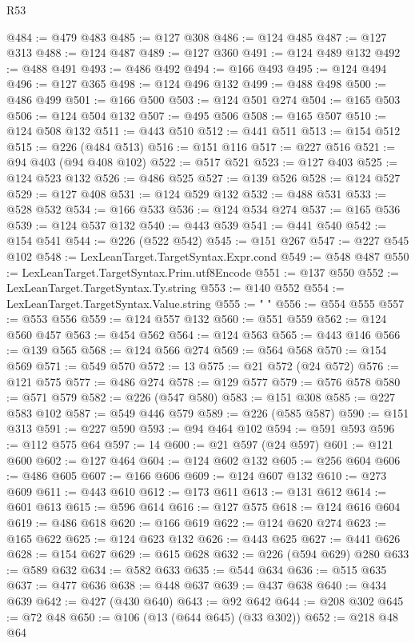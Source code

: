 \begin{lexlean}{R53}
\begin{coremodule}
@484 := @479 @483
@485 := @127 @308
@486 := @124 @485
@487 := @127 @313
@488 := @124 @487
@489 := @127 @360
@491 := @124 @489 @132
@492 := @488 @491
@493 := @486 @492
@494 := @166 @493
@495 := @124 @494
@496 := @127 @365
@498 := @124 @496 @132
@499 := @488 @498
@500 := @486 @499
@501 := @166 @500
@503 := @124 @501 @274
@504 := @165 @503
@506 := @124 @504 @132
@507 := @495 @506
@508 := @165 @507
@510 := @124 @508 @132
@511 := @443 @510
@512 := @441 @511
@513 := @154 @512
@515 := @226 (@484 @513)
@516 := @151 @116
@517 := @227 @516
@521 := @94 @403 (@94 @408 @102)
@522 := @517 @521
@523 := @127 @403
@525 := @124 @523 @132
@526 := @486 @525
@527 := @139 @526
@528 := @124 @527
@529 := @127 @408
@531 := @124 @529 @132
@532 := @488 @531
@533 := @528 @532
@534 := @166 @533
@536 := @124 @534 @274
@537 := @165 @536
@539 := @124 @537 @132
@540 := @443 @539
@541 := @441 @540
@542 := @154 @541
@544 := @226 (@522 @542)
@545 := @151 @267
@547 := @227 @545 @102
@548 := LexLeanTarget.TargetSyntax.Expr.cond
@549 := @548 @487
@550 := LexLeanTarget.TargetSyntax.Prim.utf8Encode
@551 := @137 @550
@552 := LexLeanTarget.TargetSyntax.Ty.string
@553 := @140 @552
@554 := LexLeanTarget.TargetSyntax.Value.string
@555 := " "
@556 := @554 @555
@557 := @553 @556
@559 := @124 @557 @132
@560 := @551 @559
@562 := @124 @560 @457
@563 := @454 @562
@564 := @124 @563
@565 := @443 @146
@566 := @139 @565
@568 := @124 @566 @274
@569 := @564 @568
@570 := @154 @569
@571 := @549 @570
@572 := 13
@575 := @21 @572 (@24 @572)
@576 := @121 @575
@577 := @486 @274
@578 := @129 @577
@579 := @576 @578
@580 := @571 @579
@582 := @226 (@547 @580)
@583 := @151 @308
@585 := @227 @583 @102
@587 := @549 @446 @579
@589 := @226 (@585 @587)
@590 := @151 @313
@591 := @227 @590
@593 := @94 @464 @102
@594 := @591 @593
@596 := @112 @575 @64
@597 := 14
@600 := @21 @597 (@24 @597)
@601 := @121 @600
@602 := @127 @464
@604 := @124 @602 @132
@605 := @256 @604
@606 := @486 @605
@607 := @166 @606
@609 := @124 @607 @132
@610 := @273 @609
@611 := @443 @610
@612 := @173 @611
@613 := @131 @612
@614 := @601 @613
@615 := @596 @614
@616 := @127 @575
@618 := @124 @616 @604
@619 := @486 @618
@620 := @166 @619
@622 := @124 @620 @274
@623 := @165 @622
@625 := @124 @623 @132
@626 := @443 @625
@627 := @441 @626
@628 := @154 @627
@629 := @615 @628
@632 := @226 (@594 @629) @280
@633 := @589 @632
@634 := @582 @633
@635 := @544 @634
@636 := @515 @635
@637 := @477 @636
@638 := @448 @637
@639 := @437 @638
@640 := @434 @639
@642 := @427 (@430 @640)
@643 := @92 @642
@644 := @208 @302
@645 := @72 @48
@650 := @106 (@13 (@644 @645) (@33 @302))
@652 := @218 @48 @64

\end{coremodule}
\end{lexlean}
